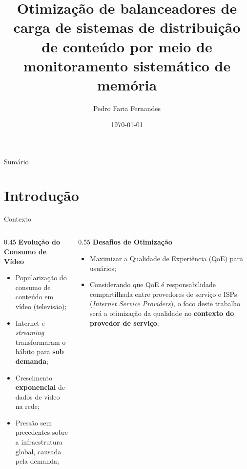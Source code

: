 \documentclass[10pt]{beamer}
\title[Otimização de balanceadores de carga de sistemas de distribuição
de conteúdo por meio de monitoramento sistemático de memória]{Otimização de balanceadores de carga de sistemas de distribuição
de conteúdo por meio de monitoramento sistemático de memória}
\subtitle{}
\author{Pedro Faria Fernandes}
\institute[]{Universidade do Estado de Santa Catarina}
\date[\today]
{\today}
\begin{document}
\frame{\titlepage}
\begin{frame}[allowframebreaks]{Sumário}
    \tableofcontents
\end{frame}


\section{Introdução}

\begin{frame}{Contexto}
    \begin{columns}[t]
    \begin{column}{0.45\textwidth}
        \textbf{Evolução do Consumo de Vídeo}
        \begin{itemize}
            \item Popularização do consumo de conteúdo em vídeo (televisão);
            \item Internet e \textit{streaming} transformaram o hábito para \textbf{sob demanda};
            \item Crescimento \textbf{exponencial} de dados de vídeo na rede;
            \item Pressão sem precedentes sobre a infraestrutura global, causada pela demanda;
        \end{itemize}
    \end{column}
    \begin{column}{0.55\textwidth}
        \textbf{Desafios de Otimização}
            \begin{itemize}
                \item Maximizar a Qualidade de Experiência (QoE) para usuários;
                \item Considerando que QoE é responsabilidade compartilhada entre provedores de serviço e ISPs (\textit{Internet Service Providers}), o foco deste trabalho será a otimização da qualidade no \textbf{contexto do provedor de serviço};
            \end{itemize}
    \end{column}
    \end{columns}
\end{frame}

\end{document}
